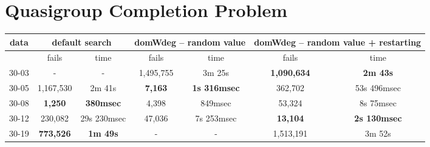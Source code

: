 \documentclass{article}
\begin{document}
    \section{ Quasigroup Completion Problem }
        \begin{tabular}{||c | c | c | c | c | c | c||} 
        \hline
            data & \multicolumn{2}{c|}{default search}  & \multicolumn{2}{c|}{domWdeg – random value}  &  \multicolumn{2}{c||}{domWdeg – random value + restarting} \\ \hline
            &  fails & time & fails & time & fails & time \\  \hline
            30-03 & - & - & 1,495,755 & 3m 25s & \textbf{1,090,634} & \textbf{2m 43s} \\ \hline
            30-05 & 1,167,530 & 2m 41s & \textbf{7,163} & \textbf{1s 316msec} & 362,702 & 53s 496msec \\ \hline
            30-08 & \textbf{1,250} & \textbf{380msec} & 4,398 & 849msec & 53,324 & 8s 75msec \\ \hline
            30-12 & 230,082 & 29s 230msec & 47,036 & 7s 253msec & \textbf{13,104} & \textbf{2s 130msec} \\ \hline
            30-19 &  \textbf{773,526} & \textbf{1m 49s} & - & - & 1,513,191 & 3m 52s \\ \hline

            \end{tabular}
\end{document}
